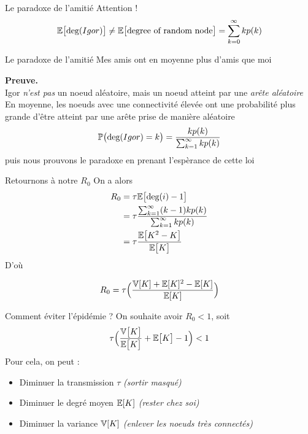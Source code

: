 \documentclass[10pt]{beamer}
\begin{document}
\begin{frame}{Le paradoxe de l'amitié}
  Attention !
  \[
    \mathbb{E}\big[\text{deg}(Igor)\big] \neq \mathbb{E}\big[\text{degree of random node}\big] = \sum_{k=0}^\infty k p(k)
  \]

  \begin{block}{Le paradoxe de l'amitié}
    Mes amis ont en moyenne plus d'amis que moi
  \end{block}
  \textbf{Preuve. }\\
  Igor \emph{n'est pas} un noeud aléatoire, mais un noeud atteint par une \emph{arête aléatoire} \\

  En moyenne, les noeuds avec une connectivité élevée ont une probabilité plus grande
  d'être atteint par une arête prise de manière aléatoire \\

  \[
    \mathbb{P}\big(\text{deg}(Igor) = k\big) = \dfrac{k p(k)}{\sum_{k=1}^\infty k p(k)}
  \]
  puis nous prouvons le paradoxe en prenant l'espèrance de cette loi
\end{frame}

\begin{frame}{Retournons à notre $R_0$}
  On a alors
  \[
    \begin{aligned}
      R_0 &= \tau \mathbb{E}\big[\text{deg}(i) - 1\big] \\
          &= \tau \dfrac{\sum_{k=1}^\infty (k-1) k p(k)}{\sum_{k=1}^\infty k p(k)} \\
          &= \tau \dfrac{\mathbb{E}\big[K^2 - K\big]}{\mathbb{E}\big[K\big]}
    \end{aligned}
  \]
  \vspace{.7cm}
  D'où
  \begin{block}{}
  \[
    R_0 = \tau \Big(\dfrac{\mathbb{V}[K] + \mathbb{E}[K]^2 - \mathbb{E}[K]}{\mathbb{E}[K]}\Big)
  \]
  \end{block}
\end{frame}

\begin{frame}{Comment éviter l'épidémie ? }
  On souhaite avoir $R_0 < 1$, soit
  \[
    \tau \Big(\dfrac{\mathbb{V}\big[K\big]}{\mathbb{E}\big[K\big]} + \mathbb{E}\big[K\big] - 1\Big) < 1
  \]
  Pour cela, on peut :
  \begin{itemize}
    \item Diminuer la transmission $\tau$ \emph{(sortir masqué)}
    \item Diminuer le degré moyen $\mathbb{E}[K]$ \emph{(rester chez soi)}
    \item Diminuer la variance $\mathbb{V}[K]$ \emph{(enlever les noeuds très connectés)}
  \end{itemize}
\end{frame}
\end{document}
